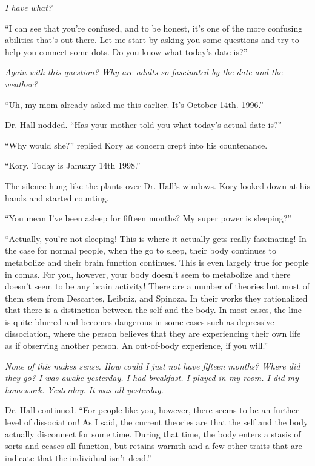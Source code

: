 \documentclass[9pt]{memoir}
\begin{document}
\textit{I have what?}

``I can see that you're confused, and to be honest, it's one of the more confusing abilities that's out there. Let me start by asking you some questions and try to help you connect some dots. Do you know what today's date is?''

\textit{Again with this question? Why are adults so fascinated by the date and the weather?}

``Uh, my mom already asked me this earlier. It's October 14th. 1996.''

Dr. Hall nodded. ``Has your mother told you what today's actual date is?''

``Why would she?'' replied Kory as concern crept into his countenance.

``Kory. Today is January 14th 1998.''

The silence hung like the plants over Dr. Hall's windows. Kory looked down at his hands and started counting.

``You mean I've been asleep for fifteen months? My super power is sleeping?''

``Actually, you're not sleeping! This is where it actually gets really fascinating! In the case for normal people, when the go to sleep, their body continues to metabolize and their brain function continues. This is even largely true for people in comas. For you, however, your body doesn't seem to metabolize and there doesn't seem to be any brain activity! There are a number of theories but most of them stem from Descartes, Leibniz, and Spinoza. In their works they rationalized that there is a distinction between the self and the body. In most cases, the line is quite blurred and becomes dangerous in some cases such as depressive dissociation, where the person believes that they are experiencing their own life as if observing another person. An out-of-body experience, if you will.''

\textit{None of this makes sense. How could I just not have fifteen months? Where did they go? I was awake yesterday. I had breakfast. I played in my room. I did my homework. Yesterday. It was all yesterday.}

Dr. Hall continued. ``For people like you, however, there seems to be an further level of dissociation! As I said, the current theories are that the self and the body actually disconnect for some time. During that time, the body enters a stasis of sorts and ceases all function, but retains warmth and a few other traits that are indicate that the individual isn't dead.''
\end{document}

